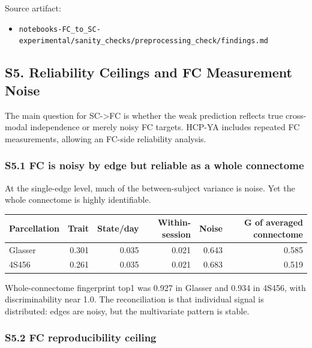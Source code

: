 Source artifact:

\begin{itemize}
\tightlist
\item
  \texttt{notebooks-FC\_to\_SC-experimental/sanity\_checks/preprocessing\_check/findings.md}
\end{itemize}

\subsection{S5. Reliability Ceilings and FC Measurement Noise}\label{s5-reliability-ceilings-and-fc-measurement-noise}

The main question for SC-\textgreater FC is whether the weak prediction reflects true cross-modal independence or merely noisy FC targets. HCP-YA includes repeated FC measurements, allowing an FC-side reliability analysis.

\subsubsection{S5.1 FC is noisy by edge but reliable as a whole connectome}\label{s51-fc-is-noisy-by-edge-but-reliable-as-a-whole-connectome}

At the single-edge level, much of the between-subject variance is noise. Yet the whole connectome is highly identifiable.

{\def\LTcaptype{none} %
\begin{longtable}[]{@{}lrrrrr@{}}
\toprule\noalign{}
Parcellation & Trait & State/day & Within-session & Noise & G of averaged connectome \\
\midrule\noalign{}
\endhead
\bottomrule\noalign{}
\endlastfoot
Glasser & 0.301 & 0.035 & 0.021 & 0.643 & 0.585 \\
4S456 & 0.261 & 0.035 & 0.021 & 0.683 & 0.519 \\
\end{longtable}
}

Whole-connectome fingerprint top1 was 0.927 in Glasser and 0.934 in 4S456, with discriminability near 1.0. The reconciliation is that individual signal is distributed: edges are noisy, but the multivariate pattern is stable.

\subsubsection{S5.2 FC reproducibility ceiling}\label{s52-fc-reproducibility-ceiling}

